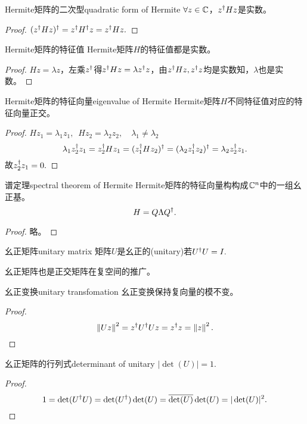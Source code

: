 \begin{theorem}{Hermite矩阵的二次型}{quadratic form of Hermite}
	$\forall z\in\mathbb C$，$z^\dagger Hz$是实数。
\end{theorem}
\begin{proof}
	$(z^\dagger Hz)^\dagger=z^\dagger H^\dagger z=z^\dagger Hz.$
\end{proof}
\begin{theorem}{Hermite矩阵的特征值}{}
	Hermite矩阵$H$的特征值都是实数。
\end{theorem}
\begin{proof}
	$Hz=\lambda z$，左乘$z^\dagger$得$z^\dagger Hz=\lambda z^\dagger z$，由$z^\dagger Hz,z^\dagger z$均是实数知，$\lambda$也是实数。
\end{proof}
\begin{theorem}{Hermite矩阵的特征向量}{eigenvalue of Hermite}
	Hermite矩阵$H$不同特征值对应的特征向量正交。
\end{theorem}
\begin{proof}
	$Hz_1=\lambda_1z_1,\enspace Hz_2=\lambda_2z_2,\quad\lambda_1\neq\lambda_2$
	\[
		\lambda_1z_2^\dagger z_1=z_2^\dagger Hz_1=(z_1^\dagger Hz_2)^\dagger=(\lambda_2z_1^\dagger z_2)^\dagger=\lambda_2z_2^\dagger z_1.
	\]
	故$z_2^\dagger z_1=0.$
\end{proof}
\begin{theorem}{谱定理}{spectral theorem of Hermite}
	Hermite矩阵的特征向量构构成$\mathbb C^n$中的一组幺正基。
	\[
		H=Q\Lambda Q^\dagger.
	\]
\end{theorem}
\begin{proof}
	略。
\end{proof}
\begin{definition}{幺正矩阵}{unitary matrix}
	矩阵$U$是幺正的(unitary)若$U^\dagger U=I.$
\end{definition}
幺正矩阵也是正交矩阵在复空间的推广。
\begin{theorem}{幺正变换}{unitary transfomation}
	幺正变换保持复向量的模不变。
\end{theorem}
\begin{proof}
	\[
		\left\lVert Uz\right\rVert^2=z^\dagger U^\dagger Uz=z^\dagger z=\left\lVert z\right\rVert^2.
	\]
\end{proof}
\begin{theorem}{幺正矩阵的行列式}{determinant of unitary}
	$|\det(U)|=1.$
\end{theorem}
\begin{proof}
	\[
		1=\det(U^\dagger U)=\det(U^\dagger)\det(U)=\overline{\det(U)}\det(U)=|\det(U)|^2.
	\]
\end{proof}
